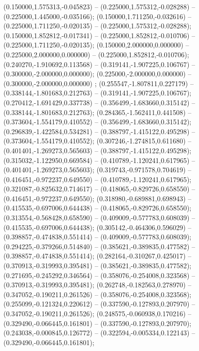  (0.150000,1.575313,-0.045823) -- (0.225000,1.575312,-0.028288) -- (0.225000,1.445000,-0.035166);
 (0.150000,1.711250,-0.032616) -- (0.225000,1.711250,-0.020135) -- (0.225000,1.575312,-0.028288);
 (0.150000,1.852812,-0.017341) -- (0.225000,1.852812,-0.010706) -- (0.225000,1.711250,-0.020135);
 (0.150000,2.000000,0.000000) -- (0.225000,2.000000,0.000000) -- (0.225000,1.852812,-0.010706);
 (0.240270,-1.910692,0.113568) -- (0.319141,-1.907225,0.106767) -- (0.300000,-2.000000,0.000000);
 (0.225000,-2.000000,0.000000) -- (0.300000,-2.000000,0.000000) ;
 (0.255547,-1.807811,0.227179) -- (0.338144,-1.801683,0.212763) -- (0.319141,-1.907225,0.106767);
 (0.270412,-1.691429,0.337738) -- (0.356499,-1.683660,0.315142) -- (0.338144,-1.801683,0.212763);
 (0.284365,-1.562411,0.441508) -- (0.373604,-1.554179,0.410552) -- (0.356499,-1.683660,0.315142);
 (0.296839,-1.422584,0.534281) -- (0.388797,-1.415122,0.495298) -- (0.373604,-1.554179,0.410552);
 (0.307246,-1.274815,0.611680) -- (0.401401,-1.269273,0.565603) -- (0.388797,-1.415122,0.495298);
 (0.315032,-1.122950,0.669584) -- (0.410789,-1.120241,0.617965) -- (0.401401,-1.269273,0.565603);
 (0.319743,-0.971578,0.704619) -- (0.416451,-0.972237,0.649550) -- (0.410789,-1.120241,0.617965);
 (0.321087,-0.825632,0.714617) -- (0.418065,-0.829726,0.658550) -- (0.416451,-0.972237,0.649550);
 (0.318980,-0.689881,0.698943) -- (0.415535,-0.697006,0.644438) -- (0.418065,-0.829726,0.658550);
 (0.313554,-0.568428,0.658590) -- (0.409009,-0.577783,0.608039) -- (0.415535,-0.697006,0.644438);
 (0.305142,-0.464306,0.596029) -- (0.398857,-0.474838,0.551414) -- (0.409009,-0.577783,0.608039);
 (0.294225,-0.379266,0.514840) -- (0.385621,-0.389835,0.477582) -- (0.398857,-0.474838,0.551414);
 (0.282164,-0.310267,0.425017) -- (0.370913,-0.319993,0.395481) -- (0.385621,-0.389835,0.477582);
 (0.271695,-0.245292,0.346564) -- (0.358076,-0.254008,0.323568) -- (0.370913,-0.319993,0.395481);
 (0.262748,-0.182563,0.278970) -- (0.347052,-0.190211,0.261526) -- (0.358076,-0.254008,0.323568);
 (0.255099,-0.121324,0.220612) -- (0.337590,-0.127893,0.207970) -- (0.347052,-0.190211,0.261526);
 (0.248575,-0.060938,0.170216) -- (0.329490,-0.066445,0.161801) -- (0.337590,-0.127893,0.207970);
 (0.243038,-0.000845,0.126772) -- (0.322594,-0.005334,0.122143) -- (0.329490,-0.066445,0.161801);
